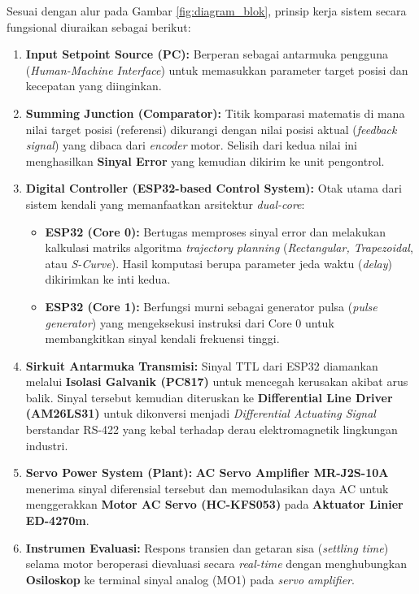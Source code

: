 Sesuai dengan alur pada Gambar \ref{fig:diagram_blok}, prinsip kerja sistem secara fungsional diuraikan sebagai berikut:
\begin{enumerate}
    \item \textbf{Input Setpoint Source (PC):} Berperan sebagai antarmuka pengguna (\textit{Human-Machine Interface}) untuk memasukkan parameter target posisi dan kecepatan yang diinginkan.
    \item \textbf{Summing Junction (Comparator):} Titik komparasi matematis di mana nilai target posisi (referensi) dikurangi dengan nilai posisi aktual (\textit{feedback signal}) yang dibaca dari \textit{encoder} motor. Selisih dari kedua nilai ini menghasilkan \textbf{Sinyal Error} yang kemudian dikirim ke unit pengontrol.
    \item \textbf{Digital Controller (ESP32-based Control System):} Otak utama dari sistem kendali yang memanfaatkan arsitektur \textit{dual-core}:
    \begin{itemize}
        \item \textbf{ESP32 (Core 0):} Bertugas memproses sinyal error dan melakukan kalkulasi matriks algoritma \textit{trajectory planning} (\textit{Rectangular, Trapezoidal}, atau \textit{S-Curve}). Hasil komputasi berupa parameter jeda waktu (\textit{delay}) dikirimkan ke inti kedua.
        \item \textbf{ESP32 (Core 1):} Berfungsi murni sebagai generator pulsa (\textit{pulse generator}) yang mengeksekusi instruksi dari Core 0 untuk membangkitkan sinyal kendali frekuensi tinggi.
    \end{itemize}
    \item \textbf{Sirkuit Antarmuka Transmisi:} Sinyal TTL dari ESP32 diamankan melalui \textbf{Isolasi Galvanik (PC817)} untuk mencegah kerusakan akibat arus balik. Sinyal tersebut kemudian diteruskan ke \textbf{Differential Line Driver (AM26LS31)} untuk dikonversi menjadi \textit{Differential Actuating Signal} berstandar RS-422 yang kebal terhadap derau elektromagnetik lingkungan industri.
    \item \textbf{Servo Power System (Plant):} \textbf{AC Servo Amplifier MR-J2S-10A} menerima sinyal diferensial tersebut dan memodulasikan daya AC untuk menggerakkan \textbf{Motor AC Servo (HC-KFS053)} pada \textbf{Aktuator Linier ED-4270m}. 
    \item \textbf{Instrumen Evaluasi:} Respons transien dan getaran sisa (\textit{settling time}) selama motor beroperasi dievaluasi secara \textit{real-time} dengan menghubungkan \textbf{Osiloskop} ke terminal sinyal analog (MO1) pada \textit{servo amplifier}.
\end{enumerate}

